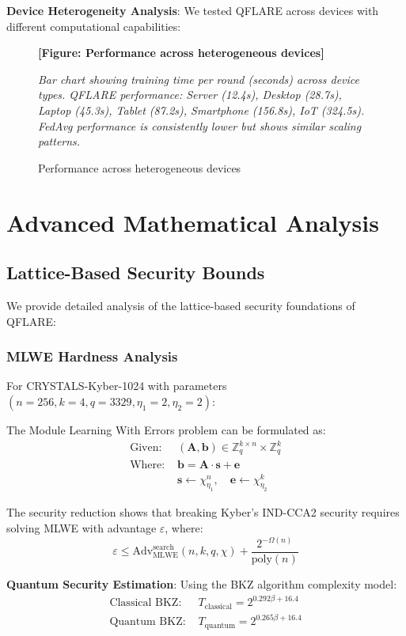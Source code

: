 \documentclass[journal,onecolumn]{IEEEtran}
\begin{document}
\textbf{Device Heterogeneity Analysis}:
We tested QFLARE across devices with different computational capabilities:

\begin{figure}[htbp]
\centering
\textbf{[Figure: Performance across heterogeneous devices]}

\textit{Bar chart showing training time per round (seconds) across device types. QFLARE performance: Server (12.4s), Desktop (28.7s), Laptop (45.3s), Tablet (87.2s), Smartphone (156.8s), IoT (324.5s). FedAvg performance is consistently lower but shows similar scaling patterns.}
\caption{Performance across heterogeneous devices}
\end{figure}

\section{Advanced Mathematical Analysis}

\subsection{Lattice-Based Security Bounds}

We provide detailed analysis of the lattice-based security foundations of QFLARE:

\subsubsection{MLWE Hardness Analysis}

For CRYSTALS-Kyber-1024 with parameters $(n=256, k=4, q=3329, \eta_1=2, \eta_2=2)$:

The Module Learning With Errors problem can be formulated as:
\begin{align}
\text{Given: } &(\mathbf{A}, \mathbf{b}) \in \mathbb{Z}_q^{k \times n} \times \mathbb{Z}_q^k \\
\text{Where: } &\mathbf{b} = \mathbf{A} \cdot \mathbf{s} + \mathbf{e} \\
&\mathbf{s} \leftarrow \chi_{\eta_1}^n, \quad \mathbf{e} \leftarrow \chi_{\eta_2}^k
\end{align}

The security reduction shows that breaking Kyber's IND-CCA2 security requires solving MLWE with advantage $\varepsilon$, where:
$$\varepsilon \leq \text{Adv}_{\text{MLWE}}^{\text{search}}(n, k, q, \chi) + \frac{2^{-\Omega(n)}}{\text{poly}(n)}$$

\textbf{Quantum Security Estimation}: Using the BKZ algorithm complexity model:
\begin{align}
\text{Classical BKZ: } &T_{\text{classical}} = 2^{0.292 \beta + 16.4} \\
\text{Quantum BKZ: } &T_{\text{quantum}} = 2^{0.265 \beta + 16.4}
\end{align}
\end{document}
